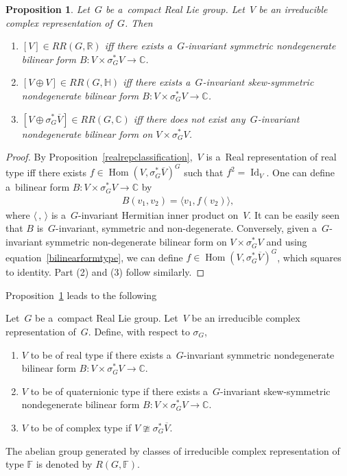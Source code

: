 \documentclass[pdftex]{sigma}
\numberwithin{equation}{section}
\newtheorem{Proposition}[Theorem]{Proposition}
{\theoremstyle{definition}
\newtheorem{Definition}[Theorem]{Definition}
\newtheorem{Example}[Theorem]{Example}
\newtheorem{Remark}[Theorem]{Remark}
}
\DeclareMathOperator{\Hom}{Hom}
\DeclareMathOperator{\Id}{Id}
\begin{document}
\begin{Proposition}
\label{formclassification}
Let~$G$ be a~compact Real Lie group.
Let~$V$ be an irreducible complex representation of~$G$.
Then
\begin{enumerate}\itemsep=0pt
\item[$1.$]
$[V]\in RR(G, \mathbb{R})$ iff there exists a~$G$-invariant symmetric nondegenerate bilinear form $B: V\times
\sigma_G^*V\to\mathbb{C}$.
\item[$2.$]
$[V\oplus V]\in RR(G, \mathbb{H})$ iff there exists a~$G$-invariant skew-symmetric nondegenerate bilinear form $B:
V\times
\sigma_G^*V\to\mathbb{C}$.
\item[$3.$]
$[V\oplus
\sigma_G^*\overline{V}
]\in RR(G, \mathbb{C})$ iff there does not exist any~$G$-invariant nondegenerate bilinear form on $V\times
\sigma_G^*V$.
\end{enumerate}
\end{Proposition}
\begin{proof}
By Proposition~\ref{realrepclassification},~$V$ is a~Real representation of real type if\/f there exists
$f\in\Hom(V,
\sigma_G^*\overline{V})^G$ such that $f^2=\Id_V$.
One can def\/ine a~bilinear form $B: V\times
\sigma_G^*V\to\mathbb{C}$ by
\begin{gather}
\label{bilinearformtype}
B(v_1, v_2)=\langle v_1, f(v_2)\rangle,
\end{gather}
where $\langle \,, \,\rangle$ is a~$G$-invariant Hermitian inner product on~$V$.
It can be easily seen that $B$ is~$G$-invariant, symmetric and non-degenerate.
Conversely, given a~$G$-invariant symmetric non-degenerate bilinear form on $V\times
\sigma_G^*V$ and using equation~\eqref{bilinearformtype}, we can def\/ine $f\in\Hom(V,
\sigma_G^*\overline{V})^G$, which squares to identity.
Part (2) and (3) follow similarly.
\end{proof}
Proposition~\ref{formclassification} leads to the following

\begin{Definition}
\label{cplxrepclassification}
Let~$G$ be a~compact Real Lie group.
Let~$V$ be an irreducible complex representation of~$G$.
Def\/ine, with respect to $\sigma_G$,
\begin{enumerate}\itemsep=0pt
\item
$V$ to be of real type if there exists a~$G$-invariant symmetric nondegenerate bilinear form $B: V\times
\sigma_G^*V\to\mathbb{C}$.
\item
$V$ to be of quaternionic type if there exists a~$G$-invariant skew-symmetric nondegenerate bilinear form $B: V\times
\sigma_G^*V\to\mathbb{C}$.
\item
$V$ to be of complex type if $V\ncong
\sigma_G^*\overline{V}$.
\end{enumerate}
The abelian group generated by classes of irreducible complex representation of type $\mathbb{F}$ is denoted by $R(G,
\mathbb{F})$.
\end{Definition}
\end{document}
